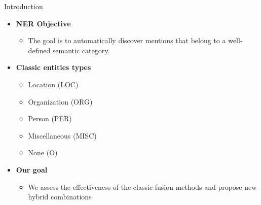 \documentclass[10pt,=table]{beamer}
\begin{document}
\begin{frame}{Introduction}
\begin{itemize}
\item<1-> \large \textbf{NER Objective}
\begin{itemize}
\item<1->  The goal is to automatically discover  mentions that belong to a well-defined semantic category. 

\end{itemize}
\item<2-> \large \textbf{Classic entities types}
	\begin{itemize}
	\item<2-> Location (LOC)
	\item<2-> Organization (ORG)
	\item<2-> Person (PER)
	\item<2-> Miscellaneous (MISC)
	\item<2-> None (O)
	\end{itemize}
\item<3-> \large \textbf{Our goal}
\begin{itemize}
\item<3-> We assess the effectiveness of the classic fusion methods and propose new hybrid combinations 
\end{itemize}

\end{itemize}
\end{frame}

%
\end{document}
